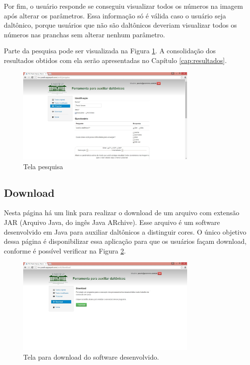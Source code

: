 \documentclass[	12pt, Times, openright, twoside, a4paper, english, brazil]{abntex2}
\begin{document}
Por fim, o usuário responde se conseguiu visualizar todos os números na imagem após alterar os parâmetros. Essa informação só é válida caso o usuário seja daltônico, porque usuários que não são daltônicos deveriam visualizar todos os números nas pranchas sem alterar nenhum parâmetro.

Parte da pesquisa pode ser visualizada na Figura \ref{fig:telaPesquisa}. A consolidação dos resultados obtidos com ela serão apresentadas no Capítulo \ref{cap:resultados}.

\begin{figure}[!htb]
\centering \includegraphics[width=0.8\textwidth]{telaPesquisa.jpg}
\caption{Tela pesquisa} \label{fig:telaPesquisa}
\end{figure}


\subsection{Download}

Nesta página há um link para realizar o download de um arquivo com extensão JAR (Arquivo Java, do ingês Java ARchive). Esse arquivo é um software desenvolvido em Java para auxiliar daltônicos a distinguir cores. O único objetivo dessa página é disponibilizar essa aplicação para que os usuários façam download, conforme é possível verificar na Figura \ref{fig:figuraDownload}.

\begin{figure}[!htb]
\centering \includegraphics[width=0.8\textwidth]{telaDownload.jpg}
\caption{Tela para download do software desenvolvido.} \label{fig:figuraDownload}
\end{figure}
\end{document}
